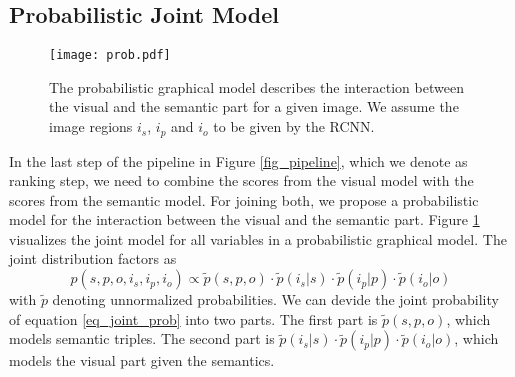 \documentclass[runningheads,a4paper]{llncs}
\begin{document}
\subsection{Probabilistic Joint Model}


\begin{figure}[t]
\centering
\texttt{[image: prob.pdf]}
\caption{The probabilistic graphical model describes the interaction between the visual and the semantic part for a given image. We assume the image regions $i_s$, $i_p$ and $i_o$ to be given by the RCNN.}
\label{fig_probmodel}
\end{figure}

In the last step of the pipeline in Figure \ref{fig_pipeline}, which we denote as ranking step, we need to combine the scores from the visual model with the scores from the semantic model. For joining both, we propose a probabilistic model for the interaction between the visual and the semantic part. Figure \ref{fig_probmodel} visualizes the joint model for all variables in a probabilistic graphical model. The joint distribution factors as 
 \begin{equation}
p(s, p, o, i_s, i_p, i_o) \propto \tilde{p}(s,p,o) \cdot \tilde{p}(i_s|s) \cdot \tilde{p}(i_p | p) \cdot \tilde{p}(i_o | o)
 \label{eq_joint_prob}
 \end{equation}
with $\tilde{p}$ denoting unnormalized probabilities. We can devide the joint probability of equation \ref{eq_joint_prob} into two parts. The first part is $\tilde{p}(s,p,o)$, which models semantic triples. The second part is $\tilde{p}(i_s|s) \cdot \tilde{p}(i_p | p) \cdot \tilde{p}(i_o | o)$, which models the visual part given the semantics. 
\end{document}
